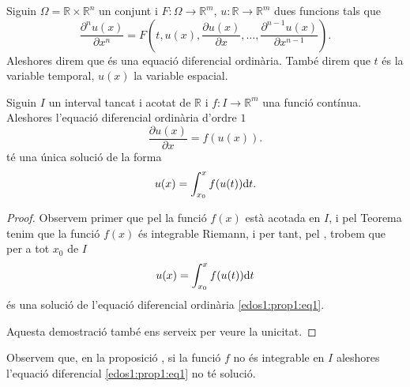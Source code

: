 \documentclass[../Apunts.tex]{subfiles}
\begin{document}
	
	\begin{definition}
		\label{def:equació diferencial ordinària d'ordre n}
		\label{def:solució de l'equació diferencial ordinària}
		Siguin \(\Omega=\mathbb{R}\times\mathbb{R}^{n}\) un conjunt i \(F\colon\Omega\longrightarrow\mathbb{R}^{m}\), \(u\colon\mathbb{R}\longrightarrow\mathbb{R}^{m}\) dues funcions tals que
		\[\frac{\partial^{n}u(x)}{\partial x^{n}}=F\left(t,u(x),\frac{\partial u(x)}{\partial x},\dots,\frac{\partial^{n-1}u(x)}{\partial x^{n-1}}\right).\]
		Aleshores direm que
		és una equació diferencial ordinària. També direm que \(t\) és la variable temporal, \(u(x)\) la variable espacial.
	\end{definition}
	\begin{proposition}
		\label{prop:edos1:1}
		Siguin \(I\) un interval tancat i acotat de \(\mathbb{R}\) i \(f\colon I\longrightarrow\mathbb{R}^{m}\) una funció contínua. Aleshores l'equació diferencial ordinària d'ordre \(1\)
		\begin{equation}
			\label{edos1:prop1:eq1}
			\frac{\partial u(x)}{\partial x}=f(u(x)).
		\end{equation}
		té una única solució de la forma
		\[u(x)=\int_{x_{0}}^{x}f(u(t))\textrm{d} t.\]
		\begin{proof}
			Observem primer que pel  la funció \(f(x)\) està acotada en \(I\), i pel Teorema  tenim que la funció \(f(x)\) és integrable Riemann, i per tant, pel , trobem que per a tot \(x_{0}\) de \(I\)
			\[u(x)=\int_{x_{0}}^{x}f(u(t))\textrm{d} t\]
			és una solució de l'equació diferencial ordinària \eqref{edos1:prop1:eq1}.
			
			Aquesta demostració també ens serveix per veure la unicitat.
		\end{proof}
	\end{proposition}
	\begin{observation} %
		Observem que, en la proposició , si la funció \(f\) no és integrable en \(I\) aleshores l'equació diferencial \eqref{edos1:prop1:eq1} no té solució. %
	\end{observation}
\end{document}
